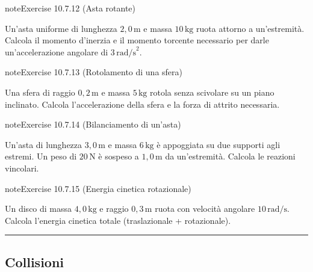 \documentclass[letterpaper,10pt,italian]{jupyterBook}
\begin{document}
\begin{sphinxadmonition}{note}{Exercise 10.7.12 (Asta rotante)}



\sphinxAtStartPar
Un’asta uniforme di lunghezza \(2,0 \, \text{m}\) e massa \(10 \, \text{kg}\) ruota attorno a un’estremità. Calcola il momento d’inerzia e il momento torcente necessario per darle un’accelerazione angolare di \(3 \, \text{rad/s}^2\).
\end{sphinxadmonition}
 \label{exercise:ch/mechanics/dynamics-problems-exercise-12}

\begin{sphinxadmonition}{note}{Exercise 10.7.13 (Rotolamento di una sfera)}



\sphinxAtStartPar
Una sfera di raggio \(0,2 \, \text{m}\) e massa \(5 \, \text{kg}\) rotola senza scivolare su un piano inclinato. Calcola l’accelerazione della sfera e la forza di attrito necessaria.
\end{sphinxadmonition}
 \label{exercise:ch/mechanics/dynamics-problems-exercise-13}

\begin{sphinxadmonition}{note}{Exercise 10.7.14 (Bilanciamento di un’asta)}



\sphinxAtStartPar
Un’asta di lunghezza \(3,0 \, \text{m}\) e massa \(6 \, \text{kg}\) è appoggiata su due supporti agli estremi. Un peso di \(20 \, \text{N}\) è sospeso a \(1,0 \, \text{m}\) da un’estremità. Calcola le reazioni vincolari.
\end{sphinxadmonition}
 \label{exercise:ch/mechanics/dynamics-problems-exercise-14}

\begin{sphinxadmonition}{note}{Exercise 10.7.15 (Energia cinetica rotazionale)}



\sphinxAtStartPar
Un disco di massa \(4,0 \, \text{kg}\) e raggio \(0,3 \, \text{m}\) ruota con velocità angolare \(10 \, \text{rad/s}\). Calcola l’energia cinetica totale (traslazionale + rotazionale).
\end{sphinxadmonition}


\bigskip\hrule\bigskip



\subsection{Collisioni}
\label{\detokenize{ch/mechanics/dynamics-problems:collisioni}} \label{exercise:ch/mechanics/dynamics-problems-exercise-15}
\end{document}
